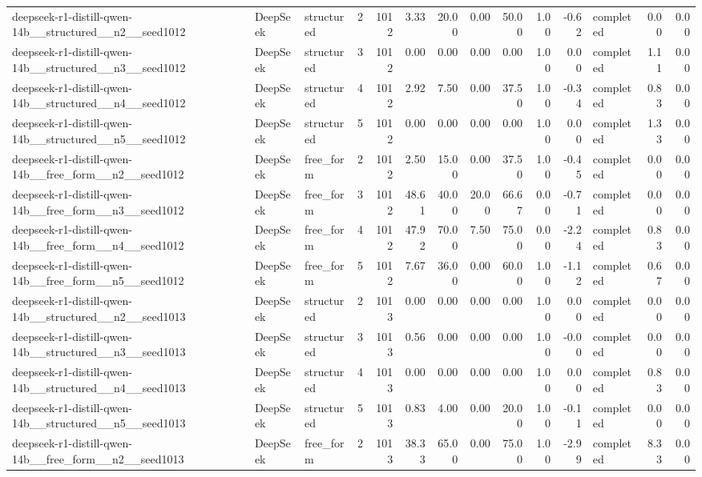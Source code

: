 \begin{longtable}{lllrrrrrrrrlrr}
deepseek-r1-distill-qwen-14b\_\_structured\_\_n2\_\_seed1012 & DeepSeek & structured & 2 & 1012 & 3.33 & 20.00 & 0.00 & 50.00 & 1.00 & -0.62 & completed & 0.00 & 0.00 \\
deepseek-r1-distill-qwen-14b\_\_structured\_\_n3\_\_seed1012 & DeepSeek & structured & 3 & 1012 & 0.00 & 0.00 & 0.00 & 0.00 & 1.00 & 0.00 & completed & 1.11 & 0.00 \\
deepseek-r1-distill-qwen-14b\_\_structured\_\_n4\_\_seed1012 & DeepSeek & structured & 4 & 1012 & 2.92 & 7.50 & 0.00 & 37.50 & 1.00 & -0.34 & completed & 0.83 & 0.00 \\
deepseek-r1-distill-qwen-14b\_\_structured\_\_n5\_\_seed1012 & DeepSeek & structured & 5 & 1012 & 0.00 & 0.00 & 0.00 & 0.00 & 1.00 & 0.00 & completed & 1.33 & 0.00 \\
deepseek-r1-distill-qwen-14b\_\_free\_form\_\_n2\_\_seed1012 & DeepSeek & free\_form & 2 & 1012 & 2.50 & 15.00 & 0.00 & 37.50 & 1.00 & -0.45 & completed & 0.00 & 0.00 \\
deepseek-r1-distill-qwen-14b\_\_free\_form\_\_n3\_\_seed1012 & DeepSeek & free\_form & 3 & 1012 & 48.61 & 40.00 & 20.00 & 66.67 & 0.00 & -0.71 & completed & 0.00 & 0.00 \\
deepseek-r1-distill-qwen-14b\_\_free\_form\_\_n4\_\_seed1012 & DeepSeek & free\_form & 4 & 1012 & 47.92 & 70.00 & 7.50 & 75.00 & 0.00 & -2.24 & completed & 0.83 & 0.00 \\
deepseek-r1-distill-qwen-14b\_\_free\_form\_\_n5\_\_seed1012 & DeepSeek & free\_form & 5 & 1012 & 7.67 & 36.00 & 0.00 & 60.00 & 1.00 & -1.12 & completed & 0.67 & 0.00 \\
deepseek-r1-distill-qwen-14b\_\_structured\_\_n2\_\_seed1013 & DeepSeek & structured & 2 & 1013 & 0.00 & 0.00 & 0.00 & 0.00 & 1.00 & 0.00 & completed & 0.00 & 0.00 \\
deepseek-r1-distill-qwen-14b\_\_structured\_\_n3\_\_seed1013 & DeepSeek & structured & 3 & 1013 & 0.56 & 0.00 & 0.00 & 0.00 & 1.00 & -0.00 & completed & 0.00 & 0.00 \\
deepseek-r1-distill-qwen-14b\_\_structured\_\_n4\_\_seed1013 & DeepSeek & structured & 4 & 1013 & 0.00 & 0.00 & 0.00 & 0.00 & 1.00 & 0.00 & completed & 0.83 & 0.00 \\
deepseek-r1-distill-qwen-14b\_\_structured\_\_n5\_\_seed1013 & DeepSeek & structured & 5 & 1013 & 0.83 & 4.00 & 0.00 & 20.00 & 1.00 & -0.11 & completed & 0.00 & 0.00 \\
deepseek-r1-distill-qwen-14b\_\_free\_form\_\_n2\_\_seed1013 & DeepSeek & free\_form & 2 & 1013 & 38.33 & 65.00 & 0.00 & 75.00 & 1.00 & -2.99 & completed & 8.33 & 0.00 \\

\end{longtable}
